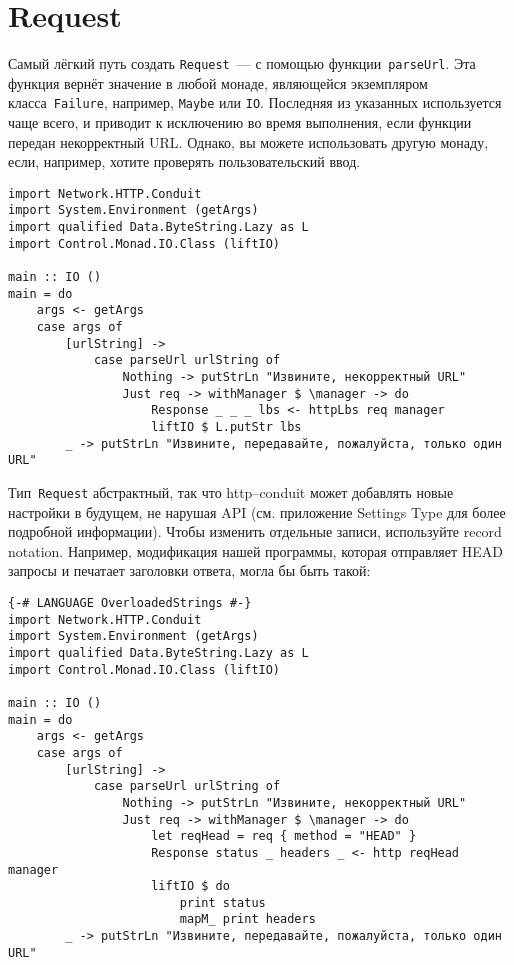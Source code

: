 \section{Request}
Самый лёгкий путь создать \lstinline!Request!~--- с помощью
функции~\lstinline!parseUrl!. Эта функция вернёт значение в любой
монаде, являющейся экземпляром класса~\lstinline!Failure!, например,
\lstinline!Maybe! или \lstinline!IO!. Последняя из указанных
используется чаще всего, и приводит к исключению во время выполнения,
если функции передан некорректный URL. Однако, вы можете использовать
другую монаду, если, например, хотите проверять пользовательский ввод.
\begin{lstlisting}
import Network.HTTP.Conduit
import System.Environment (getArgs)
import qualified Data.ByteString.Lazy as L
import Control.Monad.IO.Class (liftIO)

main :: IO ()
main = do
    args <- getArgs
    case args of
        [urlString] ->
            case parseUrl urlString of
                Nothing -> putStrLn "Извините, некорректный URL"
                Just req -> withManager $ \manager -> do
                    Response _ _ _ lbs <- httpLbs req manager
                    liftIO $ L.putStr lbs
        _ -> putStrLn "Извините, передавайте, пожалуйста, только один URL"
\end{lstlisting}
Тип~\lstinline!Request! абстрактный, так что http--conduit может
добавлять новые настройки в будущем, не нарушая API (см. приложение
Settings Type для более подробной информации). Чтобы изменить отдельные записи, используйте record
notation. Например, модификация
нашей программы, которая отправляет HEAD запросы и печатает заголовки
ответа, могла бы быть такой:
\begin{lstlisting}
{-# LANGUAGE OverloadedStrings #-}
import Network.HTTP.Conduit
import System.Environment (getArgs)
import qualified Data.ByteString.Lazy as L
import Control.Monad.IO.Class (liftIO)

main :: IO ()
main = do
    args <- getArgs
    case args of
        [urlString] ->
            case parseUrl urlString of
                Nothing -> putStrLn "Извините, некорректный URL"
                Just req -> withManager $ \manager -> do
                    let reqHead = req { method = "HEAD" }
                    Response status _ headers _ <- http reqHead manager
                    liftIO $ do
                        print status
                        mapM_ print headers
        _ -> putStrLn "Извините, передавайте, пожалуйста, только один URL"
\end{lstlisting} %

